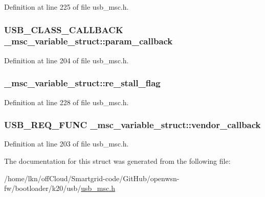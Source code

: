 Definition at line 225 of file usb\+\_\+msc.\+h.

\subsubsection[{\texorpdfstring{param\+\_\+callback}{param_callback}}]{\setlength{\rightskip}{0pt plus 5cm}U\+S\+B\+\_\+\+C\+L\+A\+S\+S\+\_\+\+C\+A\+L\+L\+B\+A\+CK \+\_\+msc\+\_\+variable\+\_\+struct\+::param\+\_\+callback}\hypertarget{struct__msc__variable__struct_a380827d386b5d511ecf66941f52edbc2}{}\label{struct__msc__variable__struct_a380827d386b5d511ecf66941f52edbc2}


Definition at line 204 of file usb\+\_\+msc.\+h.

\subsubsection[{\texorpdfstring{re\+\_\+stall\+\_\+flag}{re_stall_flag}}]{ \+\_\+msc\+\_\+variable\+\_\+struct\+::re\+\_\+stall\+\_\+flag}\hypertarget{struct__msc__variable__struct_ad64fdfc66a6a5bb4f467b49b496834db}{}\label{struct__msc__variable__struct_ad64fdfc66a6a5bb4f467b49b496834db}


Definition at line 228 of file usb\+\_\+msc.\+h.

\subsubsection[{\texorpdfstring{vendor\+\_\+callback}{vendor_callback}}]{\setlength{\rightskip}{0pt plus 5cm}U\+S\+B\+\_\+\+R\+E\+Q\+\_\+\+F\+U\+NC \+\_\+msc\+\_\+variable\+\_\+struct\+::vendor\+\_\+callback}\hypertarget{struct__msc__variable__struct_a84a609bed15d4ab6d267a8cc2a096f1f}{}\label{struct__msc__variable__struct_a84a609bed15d4ab6d267a8cc2a096f1f}


Definition at line 203 of file usb\+\_\+msc.\+h.



The documentation for this struct was generated from the following file\+:\begin{DoxyCompactItemize}
\item 
/home/lkn/off\+Cloud/\+Smartgrid-\/code/\+Git\+Hub/openwsn-\/fw/bootloader/k20/usb/\hyperlink{usb__msc_8h}{usb\+\_\+msc.\+h}\end{DoxyCompactItemize}
